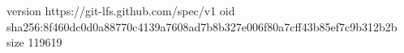 version https://git-lfs.github.com/spec/v1
oid sha256:8f460dc0d0a88770c4139a7608ad7b8b327e006f80a7cff43b85ef7c9b312b2b
size 119619
